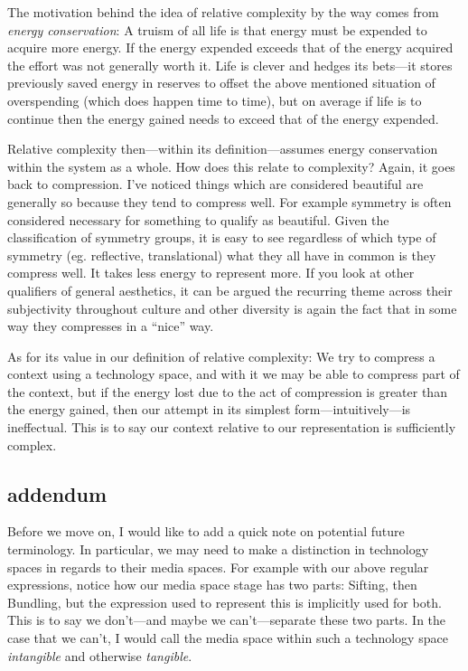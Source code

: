\documentclass[twoside]{article}
\begin{document}
The motivation behind the idea of relative complexity by the way comes from \emph{energy conservation}: A truism of all life is
that energy must be expended to acquire more energy. If the energy expended exceeds that of the energy acquired the effort was not
generally worth it. Life is clever and hedges its bets---it stores previously saved energy in reserves to offset the above mentioned
situation of overspending (which does happen time to time), but on average if life is to continue then the energy gained needs
to exceed that of the energy expended.

Relative complexity then---within its definition---assumes energy conservation within the system as a whole. How does this relate
to complexity? Again, it goes back to compression. I've noticed things which are considered beautiful are generally so because they
tend to compress well. For example symmetry is often considered necessary for something to qualify as beautiful. Given the
classification of symmetry groups, it is easy to see regardless of which type of symmetry (eg. reflective, translational)
what they all have in common is they compress well. It takes less energy to represent more. If you look at other qualifiers
of general aesthetics, it can be argued the recurring theme across their subjectivity throughout culture and other diversity
is again the fact that in some way they compresses in a ``nice'' way.

As for its value in our definition of relative complexity: We try to compress a context using a technology space, and with it
we may be able to compress part of the context, but if the energy lost due to the act of compression is greater than the energy
gained, then our attempt in its simplest form---intuitively---is ineffectual. This is to say our context relative to our
representation is sufficiently complex.

\subsection*{addendum}

Before we move on, I would like to add a quick note on potential future terminology. In particular, we may need to
make a distinction in technology spaces in regards to their media spaces. For example with our above regular expressions,
notice how our media space stage has two parts: Sifting, then Bundling, but the expression used to represent this
is implicitly used for both. This is to say we don't---and maybe we can't---separate these two parts.  In the case
that we can't, I would call the media space within such a technology space \emph{intangible} and otherwise \emph{tangible}.
\end{document}
